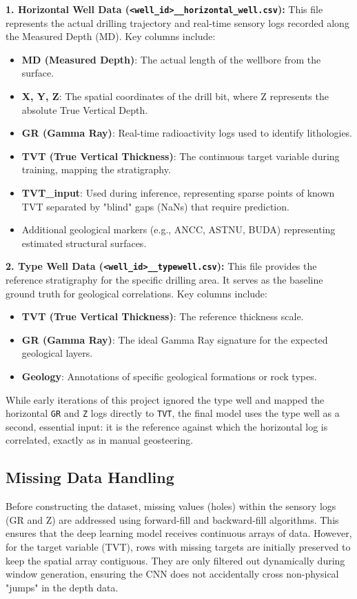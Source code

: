 \documentclass[12pt, a4paper]{article}
\begin{document}
    \textbf{1. Horizontal Well Data (\texttt{<well\_id>\_\_horizontal\_well.csv}):}
    This file represents the actual drilling trajectory and real-time sensory logs recorded along the Measured Depth (MD). Key columns include:
    \begin{itemize}
        \item \textbf{MD (Measured Depth)}: The actual length of the wellbore from the surface.
        \item \textbf{X, Y, Z}: The spatial coordinates of the drill bit, where Z represents the absolute True Vertical Depth.
        \item \textbf{GR (Gamma Ray)}: Real-time radioactivity logs used to identify lithologies.
        \item \textbf{TVT (True Vertical Thickness)}: The continuous target variable during training, mapping the stratigraphy.
        \item \textbf{TVT\_input}: Used during inference, representing sparse points of known TVT separated by "blind" gaps (NaNs) that require prediction.
        \item Additional geological markers (e.g., ANCC, ASTNU, BUDA) representing estimated structural surfaces.
    \end{itemize}

    \textbf{2. Type Well Data (\texttt{<well\_id>\_\_typewell.csv}):}
    This file provides the reference stratigraphy for the specific drilling area. It serves as the baseline ground truth for geological correlations. Key columns include:
    \begin{itemize}
        \item \textbf{TVT (True Vertical Thickness)}: The reference thickness scale.
        \item \textbf{GR (Gamma Ray)}: The ideal Gamma Ray signature for the expected geological layers.
        \item \textbf{Geology}: Annotations of specific geological formations or rock types.
    \end{itemize}

    While early iterations of this project ignored the type well and mapped the horizontal \texttt{GR} and \texttt{Z} logs directly to \texttt{TVT}, the final model uses the type well as a second, essential input: it is the reference against which the horizontal log is correlated, exactly as in manual geosteering.

    \subsection{Missing Data Handling}
    Before constructing the dataset, missing values (holes) within the sensory logs (GR and Z) are addressed using forward-fill and backward-fill algorithms. This ensures that the deep learning model receives continuous arrays of data. However, for the target variable (TVT), rows with missing targets are initially preserved to keep the spatial array contiguous. They are only filtered out dynamically during window generation, ensuring the CNN does not accidentally cross non-physical "jumps" in the depth data.
\end{document}

